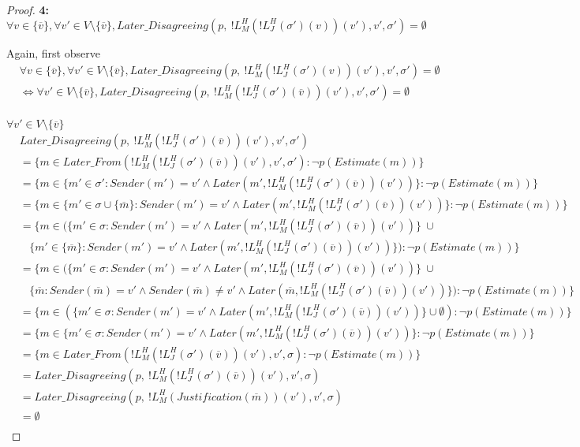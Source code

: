 \begin{proof}
\textbf{4:} $\forall v \in \{\overline{v}\}, \forall v' \in V \setminus \{\overline{v}\}, Later\_Disagreeing(p,~!L^H_M(!L^H_J(\sigma')(v))(v'), v', \sigma') = \emptyset$

Again, first observe
\begin{align}
&\forall v \in \{\overline{v}\}, \forall v' \in V \setminus \{\overline{v}\}, Later\_Disagreeing(p,~!L^H_M(!L^H_J(\sigma')(v))(v'), v', \sigma') = \emptyset \\
&\iff \forall v' \in V \setminus \{\overline{v}\}, Later\_Disagreeing(p,~!L^H_M(!L^H_J(\sigma')(\overline{v}))(v'), v', \sigma') = \emptyset \\
\end{align}

$\forall v' \in V \setminus \{\overline{v}\}$
\begin{align}
  &Later\_Disagreeing(p,~!L^H_M(!L^H_J(\sigma')(\overline{v}))(v'), v', \sigma') \\
  &= \{m \in Later\_From(!L^H_M(!L^H_J(\sigma')(\overline{v}))(v'), v', \sigma') : \neg p(Estimate(m)) \} \\
  &= \{m \in \{m' \in \sigma' : Sender(m') = v' \land Later(m', !L^H_M(!L^H_J(\sigma')(\overline{v}))(v'))\} : \neg p(Estimate(m)) \} \\
  &= \{m \in \{m' \in \sigma \cup \{\overline{m}\} : Sender(m') = v' \land Later(m', !L^H_M(!L^H_J(\sigma')(\overline{v}))(v'))\} : \neg p(Estimate(m)) \} \\
  &= \{m \in \big(\{m' \in \sigma : Sender(m') = v' \land Later(m', !L^H_M(!L^H_J(\sigma')(\overline{v}))(v'))\}~ \cup \\
  &~~~~\{m' \in \{\overline{m}\} : Sender(m') = v' \land Later(m', !L^H_M(!L^H_J(\sigma')(\overline{v}))(v'))\}\big) : \neg p(Estimate(m)) \} \\
  &= \{m \in \big(\{m' \in \sigma : Sender(m') = v' \land Later(m', !L^H_M(!L^H_J(\sigma')(\overline{v}))(v'))\}~ \cup \\
  &~~~~\{\overline{m} : Sender(\overline{m}) = v' \land Sender(\overline{m}) \neq v' \land Later(\overline{m}, !L^H_M(!L^H_J(\sigma')(\overline{v}))(v'))\}\big) : \neg p(Estimate(m)) \} \\
  &= \{m \in (\{m' \in \sigma : Sender(m') = v' \land Later(m', !L^H_M(!L^H_J(\sigma')(\overline{v}))(v'))\} \cup \emptyset) : \neg p(Estimate(m)) \} \\
  &= \{m \in \{m' \in \sigma : Sender(m') = v' \land Later(m', !L^H_M(!L^H_J(\sigma')(\overline{v}))(v'))\} : \neg p(Estimate(m)) \} \\
  &= \{m \in Later\_From(!L^H_M(!L^H_J(\sigma')(\overline{v}))(v'), v', \sigma) : \neg p(Estimate(m)) \} \\
  &= Later\_Disagreeing(p,~!L^H_M(!L^H_J(\sigma')(\overline{v}))(v'), v', \sigma) \\
  &= Later\_Disagreeing(p,~!L^H_M(Justification(\overline{m}))(v'), v', \sigma) \\
  &= \emptyset \\ %
\end{align}


\end{proof}
